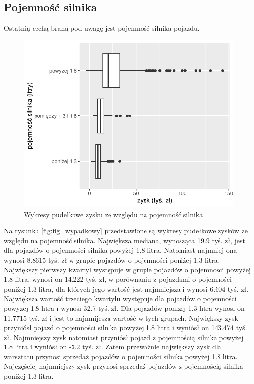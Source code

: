 \documentclass{article}\usepackage[]{graphicx}\usepackage[]{xcolor}
\makeatletter
\def\maxwidth{ %
  \ifdim\Gin@nat@width>\linewidth
    \linewidth
  \else
    \Gin@nat@width
  \fi
}
\newenvironment{knitrout}{}{} %
\makeatother
\begin{document}
\subsection{Pojemność silnika}

Ostatnią cechą braną pod uwagę jest pojemność silnika pojazdu.

\begin{knitrout}
\color{fgcolor}\begin{figure}[H]

{\centering \includegraphics[width=\maxwidth]{figure/fig_pojemnosc-1} 

}

\caption[Wykresy pudełkowe zysku ze względu na pojemność silnika]{Wykresy pudełkowe zysku ze względu na pojemność silnika}\label{fig:fig_pojemnosc}
\end{figure}

\end{knitrout}

Na rysunku \ref{fig:fig_wypadkowy} przedstawione są wykresy pudełkowe zysków ze względu na pojemność silnika. Największa mediana, wynosząca 19.9 tyś. zł, jest dla pojazdów o pojemności silnika powyżej 1.8 litra. Natomiast najmniej ona wynosi 8.8615 tyś. zł w grupie pojazdów o pojemności poniżej 1.3 litra. 
Największy pierwszy kwartyl występuje w grupie pojazdów o pojemności powyżej 1.8 litra, wynosi on 14.222 tyś. zł, w porównaniu z pojazdami o pojemności poniżej 1.3 litra, dla których jego wartość jest najmniejsza i wynosi 6.604 tyś. zł.
Największa wartość trzeciego kwartylu występuje dla pojazdów o pojemności powyżej 1.8 litra i wynosi 32.7 tyś. zł. Dla pojazdów poniżej 1.3 litra wynosi on 11.7715 tyś. zł i jest to najmnijesza wartość w tych grupach.
Największy zysk przyniósł pojazd o pojemności silnika powyżej 1.8 litra i wyniósł on 143.474 tyś. zł. 
Najmniejszy zysk natomiast przyniósł pojazd z pojemnością silnika powyżej 1.8 litra i wyniósł on -3.2 tyś. zł. Zatem przeważnie największy zysk dla warsztatu przynosi sprzedaż pojazdów o pojemności silnika powyżej 1.8 litra. Najczęściej najmniejszy zysk przynosi sprzedaż pojazdów z pojemnością silnika poniżej 1.3 litra.
\end{document}
